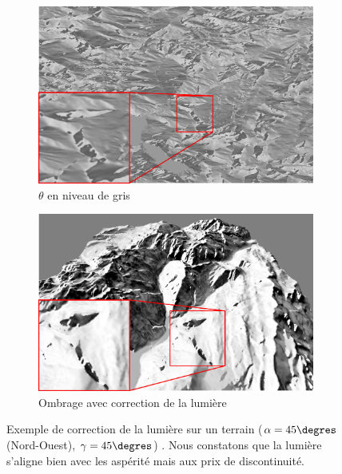 \begin{figure}[h!]
\centering
 \begin{subfigure}[t]{0.47\textwidth}
 \centering
 \includegraphics[width=1.0\linewidth]{Solution/theta_discontinu.png}
 \caption{$\theta$ en niveau de gris}
 \end{subfigure}
 \begin{subfigure}[t]{0.47\textwidth}
 \centering
 \includegraphics[width=1.0\linewidth]{Solution/ombrage_discontinue.png}
 \caption{Ombrage avec correction de la lumière}
 \end{subfigure}
 \caption{\label{fig:shadingDiscontinu}Exemple de correction de la lumière sur un terrain ($\alpha = 45\degres$ (Nord-Ouest), $\gamma = 45 \degres$) . Nous constatons que la lumière s’aligne bien avec les aspérité mais aux prix de discontinuité. }
\end{figure}





